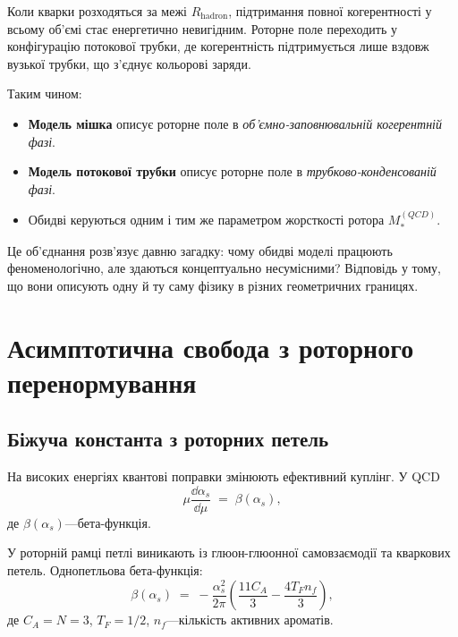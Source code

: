\documentclass[11pt,a4paper]{article}
\theoremstyle{definition}
\theoremstyle{plain}
\theoremstyle{remark}
\begin{document}
Коли кварки розходяться за межі $R_{\mathrm{hadron}}$, підтримання повної когерентності у всьому об'ємі стає енергетично невигідним. Роторне поле переходить у конфігурацію потокової трубки, де когерентність підтримується лише вздовж вузької трубки, що з'єднує кольорові заряди.

Таким чином:
\begin{itemize}[leftmargin=*,itemsep=3pt]
  \item \textbf{Модель мішка} описує роторне поле в \emph{об'ємно-заповнювальній когерентній фазі}.
  \item \textbf{Модель потокової трубки} описує роторне поле в \emph{трубково-конденсованій фазі}.
  \item Обидві керуються одним і тим же параметром жорсткості ротора $M_*^{(QCD)}$.
\end{itemize}

Це об'єднання розв'язує давню загадку: чому обидві моделі працюють феноменологічно, але здаються концептуально несумісними? Відповідь у тому, що вони описують одну й ту саму фізику в різних геометричних границях.

\vspace{1em}

\section{Асимптотична свобода з роторного перенормування}
\label{sec:asymptotic-freedom}

\subsection{Біжуча константа з роторних петель}

На високих енергіях квантові поправки змінюють ефективний куплінг. У QCD
\begin{equation}
\mu \frac{\dd\alpha_s}{\dd\mu} \;=\; \beta(\alpha_s),
\label{eq:rge}
\end{equation}
де $\beta(\alpha_s)$—бета-функція.

У роторній рамці петлі виникають із глюон-глюонної самовзаємодії та кваркових петель. Однопетльова бета-функція:
\begin{equation}
\beta(\alpha_s) \;=\; -\frac{\alpha_s^2}{2\pi}\left(\frac{11C_A}{3} - \frac{4T_F n_f}{3}\right),
\label{eq:beta-function}
\end{equation}
де $C_A=N=3$, $T_F=1/2$, $n_f$—кількість активних ароматів.
\end{document}

